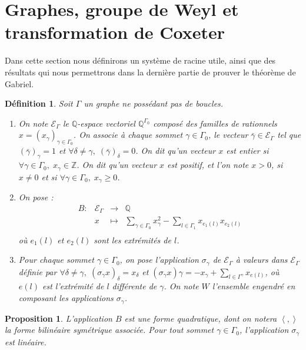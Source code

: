 \documentclass[a4paper,10pt]{article}
\newtheorem{defi}[]{Définition}[section]
\newtheorem{prop}[]{Proposition}[section]
\newcommand{\ps}[2]{\left\langle#1,#2\right\rangle}
\begin{document}
\section{Graphes, groupe de Weyl et transformation de Coxeter}
	Dans cette section nous définirons un système de racine utile, ainsi que des résultats qui nous permettrons dans la dernière partie de prouver le théorème de Gabriel.
		\begin{defi}
		Soit $\Gamma$ un graphe ne possédant pas de boucles.
		\begin{enumerate}
			\item On note $\mathscr E_{\Gamma}$ le $\mathbb Q$-espace vectoriel $\mathbb Q^{\Gamma_0}$ composé des familles de rationnels $x=(x_\gamma)_{\gamma\in\Gamma_0}$. On associe à chaque sommet $\gamma\in\Gamma_0$, le vecteur $\bar{\gamma}\in\mathscr E_\Gamma$ tel que $(\bar\gamma)_\gamma=1$ et $\forall \delta\neq\gamma,\;(\bar\gamma)_\delta=0$. On dit qu'un vecteur $x$ est \emph{entier} si $\forall\gamma\in\Gamma_{0},\;x_\gamma\in\mathbb Z$. On dit qu'un vecteur $x$ est \emph{positif}, et l'on note $x>0$, si $x\neq0$ et si $\forall\gamma\in\Gamma_0,\;x_\gamma\geq0$.
			\item On pose :
				\[
				\begin{array}{rccc}
					B:&\mathscr E_{\Gamma}&\longrightarrow&\mathbb Q\\
					&x&\longmapsto&\underset{\gamma\in\Gamma_0}{\sum} x_\gamma^2-\underset{l\in\Gamma_1}{\sum}x_{e_1(l)}x_{e_2(l)}\\
				\end{array}
			\]
			où $e_1(l)$ et $e_2(l)$ sont les extrémités de $l$.
		\item Pour chaque sommet $\gamma\in\Gamma_0$, on pose l'application $\sigma_\gamma$ de $\mathscr E_\Gamma$ à valeurs dans $\mathscr E_\Gamma$ définie par $\forall\delta\neq\gamma,\; (\sigma_\gamma x)_\delta=x_\delta$ et $(\sigma_\gamma x)\gamma=-x_\gamma+\sum_{l\in\Gamma^\gamma}x_{e(l)}$, où $e(l)$ est l'extrémité de $l$ différente de $\gamma$. On note $W$ l'ensemble engendré en composant les applications $\sigma_\gamma$.
		\end{enumerate}
		\end{defi}
		\begin{prop}
			L'application $B$ est une forme quadratique, dont on notera $\ps{}{}$ la forme bilinéaire symétrique associée. Pour tout sommet $\gamma\in\Gamma_0$, l'application $\sigma_\gamma$ est linéaire.
		\end{prop}
\end{document}
